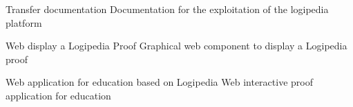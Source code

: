 \begin{workpackage}[id=access,wphases=0-48,type=MGT,
  short=Access,%
  title={Access to the infrastructure},
  lead=Irt,IrtRM=23,OcaRM=6,EduRM=12,InrRM=18]
\begin{wpdelivs}
  \begin{wpdeliv}[due=48,miles=???,id=transfer-doc,dissem=PU,nature=R,lead=Irt]{Transfer documentation}
    Documentation for the exploitation of the logipedia platform
  \end{wpdeliv}

  \begin{wpdeliv}[due=36,miles=???,id=edu-display,dissem=PU,nature=D,lead=Edu]{Web display a Logipedia Proof}
    Graphical web component to display a Logipedia proof
  \end{wpdeliv}

  \begin{wpdeliv}[due=36,miles=???,id=edu-app,dissem=PU,nature=OTHER,lead=Edu]{Web application for education based on Logipedia}
    Web interactive proof application for education
  \end{wpdeliv}

\end{wpdelivs}

\end{workpackage}

